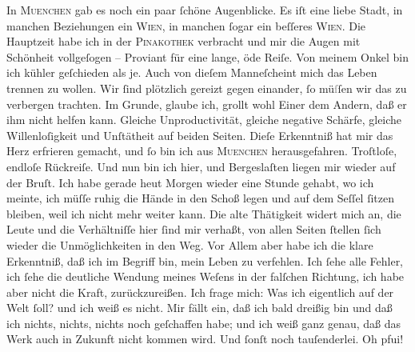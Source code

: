 \pstart
           In \textsc{Muenchen} gab es noch ein paar{ }ſchöne Augenblicke. Es iſt eine liebe Stadt, in {\pb}manchen Beziehungen ein \textsc{Wien}, in manchen{ }ſogar ein beſſeres \textsc{Wien}. Die Hauptzeit habe ich in der \textsc{Pinakothek} verbracht und mir die Augen mit Schönheit vollgeſogen – Proviant für eine
               lange, öde Reiſe.  Von meinem
                  Onkel bin ich kühler
               geſchieden als je. Auch von dieſem Manneſcheint mich das Leben trennen zu wollen. Wir{ }ſind plötzlich gereizt
               gegen einander,{ }ſo mü\textcolor{gray}{ſ}ſen wir das zu verbergen trachten. Im
               Grunde, glaube ich, grollt wohl Einer dem Andern, daß er ihm nicht helfen kann.
               Gleiche Unproductivität, gleiche negative Schärfe, gleiche Willenloſigkeit und
               Unſtätheit auf beiden Seiten. Dieſe Erkenntniß hat mir das Herz erfrieren gemacht,
               und{ }ſo bin ich aus \textsc{Muenchen} herausgefahren. Troſtloſe, endloſe Rückreiſe. {\pb}Und nun bin ich hier, und Bergeslaſten liegen mir wieder auf der Bruſt. Ich habe
               gerade heut{ }Morgen wieder eine Stunde gehabt, wo ich meinte, ich müſſe ruhig die
               Hände in den Schoß legen und auf dem Seſſel{ }ſitzen bleiben, weil ich nicht mehr
               weiter kann. Die alte Thätigkeit widert mich an, die Leute und die Verhältniſſe hier{ }ſind mir verhaßt, von allen Seiten{ }ſtellen{ }ſich wieder die Unmöglichkeiten in den
               Weg. Vor Allem  aber habe ich  die klare Erkenntniß, daß
               ich im Begriff bin, mein Leben zu verfehlen. Ich{ }ſehe alle Fehler, ich{ }ſehe die
               deutliche \strikeout{\textcolor{gray}{W}} Wendung meines Weſens in der falſchen Richtung, ich {\pb}habe aber nicht die Kraft, zurückzureißen. Ich frage
               mich: Was ich eigentlich auf der Welt{ }ſoll? und ich weiß es nicht. Mir fällt ein, daß
               ich bald dreißig bin und daß ich nichts, nichts, nichts noch geſchaffen habe; und ich
               weiß ganz genau, daß das Werk auch in Zukunft nicht kommen wird. Und{ }ſonſt noch
               tauſenderlei. Oh pfui! {\dotsfive}\pend
           
